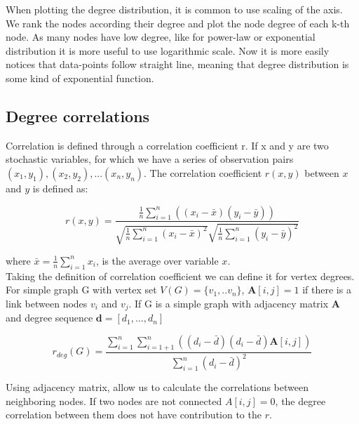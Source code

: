 When plotting the degree distribution, it is common to use scaling of the axis. We rank the nodes according their degree and plot the node degree of each k-th node. As many nodes have  low degree, like for power-law or exponential distribution it is more useful to use logarithmic scale. Now it is more easily notices that data-points follow straight line, meaning that degree distribution is some kind of exponential function. 


\subsection{Degree correlations}

Correlation is defined through a correlation coefficient r. If x and y are two stochastic variables, for which we have a series of observation pairs $(x_1, y_1), (x_2, y_2), ... (x_n, y_n)$. The correlation coefficient $r(x, y)$ between $x$ and $y$ is defined as:

\begin{equation}
r(x, y) = \frac{\frac{1}{n}\sum_{i=1}^{n}((x_i - \bar{x} ) (y_i - \bar{y}) )}{\sqrt{\frac{1}{n}\sum_{i=1}^{n}(x_i - \bar{x})^2} \sqrt{\frac{1}{n}\sum_{i=1}^{n}(y_i - \bar{y})^2} }
\end{equation}

where $\bar{x} = \frac{1}{n}\sum_{i=1}^{n}x_i$, is the average over variable $x$. \\

Taking the definition of correlation coefficient we can define it for vertex degrees. For simple graph G with vertex set $V(G) = \{v_1, ..v_n\}$, $\boldsymbol{A}[i,j] = 1$ if there is a link between nodes $v_i$ and $v_j$. If G is a simple graph with adjacency matrix $\boldsymbol{A}$ and degree sequence $\boldsymbol{d} = [d_1, ..., d_n]$

\begin{equation}
r_{deg}(G) = \frac{\sum_{i=1}^{n}\sum_{i=1+1}^{n}((d_i - \bar{d}) (d_i - \bar{d}) \boldsymbol{A}[i,j] )}{\sum_{i=1}^{n}(d_i - \bar{d})^2}
\end{equation}

Using adjacency matrix, allow us to calculate the correlations between neighboring nodes. If two nodes are not connected $A[i,j]=0$, the degree correlation between them does not have contribution to the $r$.

